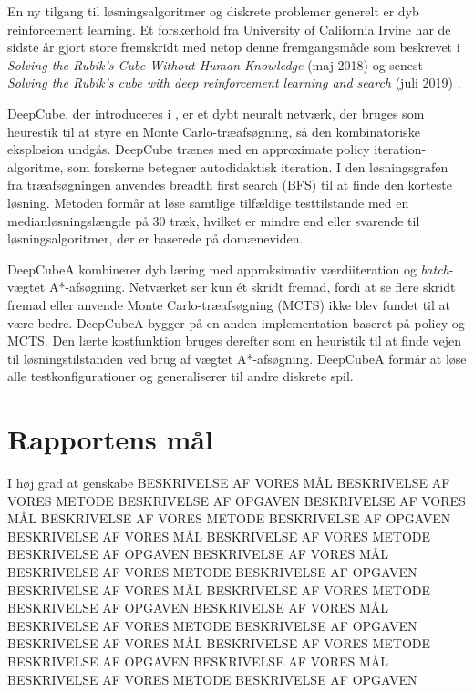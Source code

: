 \documentclass[../main.tex]{subfiles}
\begin{document}
En ny tilgang til løsningsalgoritmer og diskrete problemer generelt er dyb reinforcement learning.
Et forskerhold fra University of California Irvine har de sidste år gjort store fremskridt med netop denne fremgangsmåde som beskrevet i \textit{Solving the Rubik's Cube Without Human Knowledge} (maj 2018) \cite{HumansBeGone} og senest \textit{Solving the Rubik’s cube with deep reinforcement learning and search} (juli 2019) \cite{SolvingNature}.

DeepCube, der introduceres i \cite{HumansBeGone}, er et dybt neuralt netværk, der bruges som heurestik til at styre en Monte Carlo-træafsøgning, så den kombinatoriske eksplosion undgås.
DeepCube trænes med en approximate policy iteration-algoritme, som forskerne betegner autodidaktisk iteration.
I den løsningsgrafen fra træafsøgningen anvendes breadth first search (BFS) til at finde den korteste løsning.
Metoden formår at løse samtlige tilfældige testtilstande med en medianløsningslængde på 30 træk, hvilket er mindre end eller svarende til løsningsalgoritmer, der er baserede på domæneviden.

DeepCubeA \cite{SolvingNature} kombinerer dyb læring med approksimativ værdiiteration og \emph{batch}-vægtet A*-afsøgning.
Netværket ser kun ét skridt fremad, fordi at se flere skridt fremad eller anvende Monte Carlo-træafsøgning (MCTS) ikke blev fundet til at være bedre.
DeepCubeA bygger på en anden implementation baseret på policy og MCTS.
Den lærte kostfunktion bruges derefter som en heuristik til at finde vejen til løsningstilstanden ved brug af vægtet A*-afsøgning.
DeepCubeA formår at løse alle testkonfigurationer og generaliserer til andre diskrete spil.


\section{Rapportens mål}
I høj grad at genskabe \cite{HumansBeGone}
BESKRIVELSE AF VORES MÅL BESKRIVELSE AF VORES METODE BESKRIVELSE AF OPGAVEN BESKRIVELSE AF VORES MÅL BESKRIVELSE AF VORES METODE BESKRIVELSE AF OPGAVEN BESKRIVELSE AF VORES MÅL BESKRIVELSE AF VORES METODE BESKRIVELSE AF OPGAVEN BESKRIVELSE AF VORES MÅL BESKRIVELSE AF VORES METODE BESKRIVELSE AF OPGAVEN 
BESKRIVELSE AF VORES MÅL BESKRIVELSE AF VORES METODE BESKRIVELSE AF OPGAVEN BESKRIVELSE AF VORES MÅL BESKRIVELSE AF VORES METODE BESKRIVELSE AF OPGAVEN BESKRIVELSE AF VORES MÅL BESKRIVELSE AF VORES METODE BESKRIVELSE AF OPGAVEN BESKRIVELSE AF VORES MÅL BESKRIVELSE AF VORES METODE BESKRIVELSE AF OPGAVEN 
\end{document}
